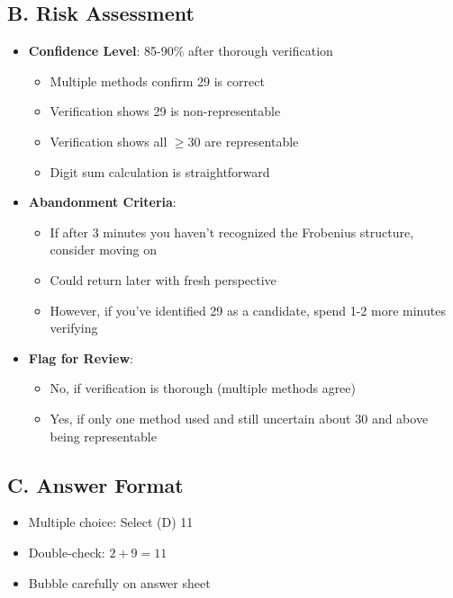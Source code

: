 \documentclass[12pt]{article}
\begin{document}
\begin{competitionbox}
\subsection*{B. Risk Assessment}
\begin{itemize}[leftmargin=*]
    \item \textbf{Confidence Level}: 85-90\% after thorough verification
    \begin{itemize}
        \item Multiple methods confirm 29 is correct
        \item Verification shows 29 is non-representable
        \item Verification shows all $\geq 30$ are representable
        \item Digit sum calculation is straightforward
    \end{itemize}
    \item \textbf{Abandonment Criteria}: 
    \begin{itemize}
        \item If after 3 minutes you haven't recognized the Frobenius structure, consider moving on
        \item Could return later with fresh perspective
        \item However, if you've identified 29 as a candidate, spend 1-2 more minutes verifying
    \end{itemize}
    \item \textbf{Flag for Review}: 
    \begin{itemize}
        \item No, if verification is thorough (multiple methods agree)
        \item Yes, if only one method used and still uncertain about 30 and above being representable
    \end{itemize}
\end{itemize}

\subsection*{C. Answer Format}
\begin{itemize}[leftmargin=*]
    \item Multiple choice: Select (D) 11
    \item Double-check: $2 + 9 = 11$ \checkmark
    \item Bubble carefully on answer sheet
\end{itemize}
\end{competitionbox}
\end{document}
